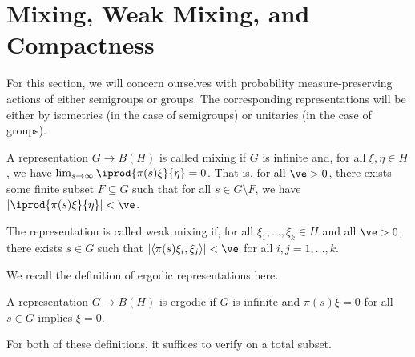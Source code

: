 \documentclass[10pt]{mypackage}
\begin{document}
\section{Mixing, Weak Mixing, and Compactness}%
For this section, we will concern ourselves with probability measure-preserving actions of either semigroups or groups. The corresponding representations will be either by isometries (in the case of semigroups) or unitaries (in the case of groups).
\begin{definition}
  A representation $G\rightarrow B(H)$ is called mixing if $G$ is infinite and, for all $\xi,\eta\in H$, we have $\lim_{s\rightarrow\infty} \iprod{\pi(s)\xi}{\eta} = 0$. That is, for all $\ve > 0$, there exists some finite subset $F\subseteq G$ such that for all $s\in G\setminus F$, we have $\left\vert \iprod{\pi(s)\xi}{\eta} \right\vert < \ve$.

  The representation is called weak mixing if, for all $\xi_1,\dots,\xi_k\in H$ and all $\ve > 0$, there exists $s\in G$ such that $\left\vert \left\langle \pi(s)\xi_i,\xi_j \right\rangle \right\vert < \ve$ for all $i,j=1,\dots,k$.
\end{definition}
We recall the definition of ergodic representations here.
\begin{definition}
  A representation $G\to B(H)$ is ergodic if $G$ is infinite and $\pi(s)\xi = 0$ for all $s\in G$ implies $\xi = 0$.
\end{definition}
For both of these definitions, it suffices to verify on a total subset.
\end{document}
